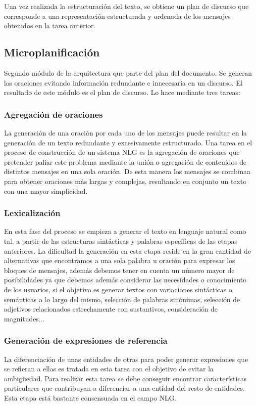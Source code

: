 Una vez realizada la estructuración del texto, se obtiene un plan de discurso que corresponde a una representación estructurada y ordenada de los mensajes obtenidos en la tarea anterior.

\subsection{Microplanificación}
Segundo módulo de la arquitectura que parte del plan del documento. Se generan las oraciones evitando información redundante e innecesaria en un discurso. El resultado de este módulo es el plan de discurso. Lo hace mediante tres tareas:

\subsubsection{Agregación de oraciones}
La generación de una oración por cada uno de los mensajes puede resultar en la generación de un texto redundante y excesivamente estructurado. Una tarea en el proceso de construcción de un sistema NLG es la agregación de oraciones que pretender paliar este problema mediante la unión o agregación de contenidos de distintos mensajes en una sola oración. De esta manera los mensajes se combinan para obtener oraciones más largas y complejas, resultando en conjunto un texto con una mayor simplicidad.

\subsubsection{Lexicalización}
En esta fase del proceso se empieza a generar el texto en lenguaje natural como tal, a partir de las estructuras sintácticas y palabras específicas de las etapas anteriores. La dificultad  la generación en esta etapa reside en la gran cantidad de alternativas que encontramos a una sola palabra u oración para expresar los bloques de mensajes, además debemos tener en cuenta un número mayor de posibilidades ya que debemos además considerar las necesidades o conocimiento de los usuarios, si el objetivo es generar textos con variaciones sintácticas o semánticas a lo largo del mismo, selección de palabras sinónimas, selección de adjetivos relacionados estrechamente con sustantivos, consideración de magnitudes... 


\subsubsection{Generación de expresiones de referencia}
La diferenciación de unas entidades de otras para poder generar expresiones que se refieran a ellas es tratada en esta tarea con el objetivo de evitar la ambigüedad. Para realizar esta tarea se debe conseguir encontrar características particulares que contribuyan a diferenciar a una entidad del resto de entidades. Esta etapa está bastante consensuada en el campo NLG. 

